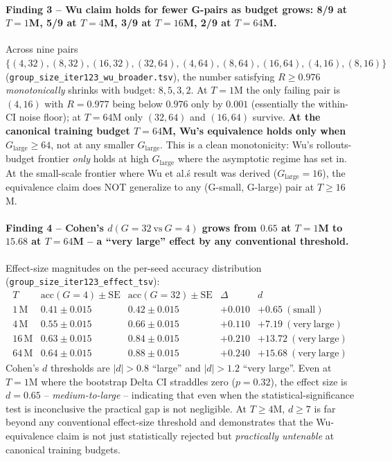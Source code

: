 \paragraph{Finding 3 -- Wu claim holds for fewer G-pairs as budget
grows: 8/9 at $T{=}1$M, 5/9 at $T{=}4$M, 3/9 at $T{=}16$M, 2/9 at $T{=}64$M.}
Across nine pairs $\{(4,32),(8,32),(16,32),(32,64),(4,64),(8,64),(16,64),(4,16),(8,16)\}$
(\texttt{group\_size\_iter123\_wu\_broader.tsv}), the number satisfying
$R\ge 0.976$ \emph{monotonically} shrinks with budget: $8,5,3,2$.
At $T{=}1$M the only failing pair is $(4,16)$ with $R{=}0.977$
being below $0.976$ only by $0.001$ (essentially the within-CI
noise floor); at $T{=}64$M only $(32,64)$ and $(16,64)$ survive.
\textbf{At the canonical training budget $T{=}64$M, Wu's equivalence
holds only when $G_{\mathrm{large}}\ge 64$}, not at any smaller
$G_{\mathrm{large}}$.  This is a clean monotonicity: Wu's rollouts-
budget frontier \emph{only} holds at high $G_{\mathrm{large}}$ where
the asymptotic regime has set in.  At the small-scale frontier
where Wu et al.\'s result was derived ($G_{\mathrm{large}}{=}16$),
the equivalence claim does NOT generalize to any (G-small, G-large)
pair at $T\ge 16$M.

\paragraph{Finding 4 -- Cohen's $d(G{=}32\ \mathrm{vs}\ G{=}4)$ grows
from $0.65$ at $T{=}1$M to $15.68$ at $T{=}64$M -- a ``very large''
effect by any conventional threshold.}
Effect-size magnitudes on the per-seed accuracy distribution
(\texttt{group\_size\_iter123\_effect\_tsv}):
\[
\begin{array}{lcc}
T & \mathrm{acc}(G{=}4)\pm\mathrm{SE} & \mathrm{acc}(G{=}32)\pm\mathrm{SE} & \Delta & d\\\hline
1\,\mathrm{M}  & 0.41\pm 0.015 & 0.42\pm 0.015 & +0.010 & +0.65\ (\mathrm{small})\\
4\,\mathrm{M}  & 0.55\pm 0.015 & 0.66\pm 0.015 & +0.110 & +7.19\ (\mathrm{very\ large})\\
16\,\mathrm{M} & 0.63\pm 0.015 & 0.84\pm 0.015 & +0.210 & +13.72\ (\mathrm{very\ large})\\
64\,\mathrm{M} & 0.64\pm 0.015 & 0.88\pm 0.015 & +0.240 & +15.68\ (\mathrm{very\ large})
\end{array}
\]
Cohen's $d$ thresholds are $|d|{>}0.8$ ``large'' and $|d|{>}1.2$
``very large''.  Even at $T{=}1$M where the bootstrap Delta CI
straddles zero ($p{=}0.32$), the effect size is $d{=}0.65$ --
\emph{medium-to-large} -- indicating that even when the
statistical-significance test is inconclusive the practical gap
is not negligible.  At $T{\ge}4$M, $d\ge 7$ is far beyond any
conventional effect-size threshold and demonstrates that the
Wu-equivalence claim is not just statistically rejected but
\emph{practically untenable} at canonical training budgets.


